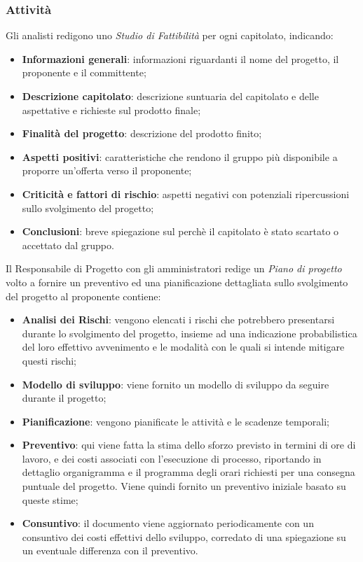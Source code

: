 		\subsubsection{Attività}
		    Gli analisti redigono uno \textit{Studio di Fattibilità} per ogni capitolato, indicando:
		    \begin{itemize}
		        \item \textbf{Informazioni generali}: informazioni riguardanti il nome del progetto, il proponente e il committente;
		        \item \textbf{Descrizione capitolato}: descrizione suntuaria del capitolato e delle aspettative e richieste sul prodotto finale;
		        \item \textbf{Finalità del progetto}: descrizione del prodotto finito;
		        \item \textbf{Aspetti positivi}: caratteristiche che rendono il gruppo più disponibile a proporre un'offerta verso il proponente;
		        \item \textbf{Criticità e fattori di rischio}: aspetti negativi con potenziali ripercussioni sullo svolgimento del progetto;
		        \item \textbf{Conclusioni}: breve spiegazione sul perchè il capitolato è stato scartato o accettato dal gruppo.
		    \end{itemize}
			Il Responsabile di Progetto con gli amministratori redige un \textit{Piano di progetto} volto a fornire un preventivo ed una pianificazione dettagliata sullo svolgimento del progetto al proponente contiene:
			\begin{itemize}
			    \item \textbf{Analisi dei Rischi}: vengono elencati i rischi che potrebbero presentarsi durante lo svolgimento del progetto, insieme ad una indicazione probabilistica del loro effettivo avvenimento e le modalità con le quali si intende mitigare questi rischi;
			    \item \textbf{Modello di sviluppo}: viene fornito un modello di sviluppo da seguire durante il progetto;
			    \item \textbf{Pianificazione}: vengono pianificate le attività e le scadenze temporali;
			    \item \textbf{Preventivo}: qui viene fatta la stima dello sforzo previsto in termini di ore di lavoro, e dei costi associati con l'esecuzione di processo, riportando in dettaglio organigramma e il programma degli orari richiesti per una consegna puntuale del progetto. Viene quindi fornito un preventivo iniziale basato su queste stime;
			    \item \textbf{Consuntivo}: il documento viene aggiornato periodicamente con un consuntivo dei costi effettivi dello sviluppo, corredato di una spiegazione su un eventuale differenza con il preventivo.
			\end{itemize}
